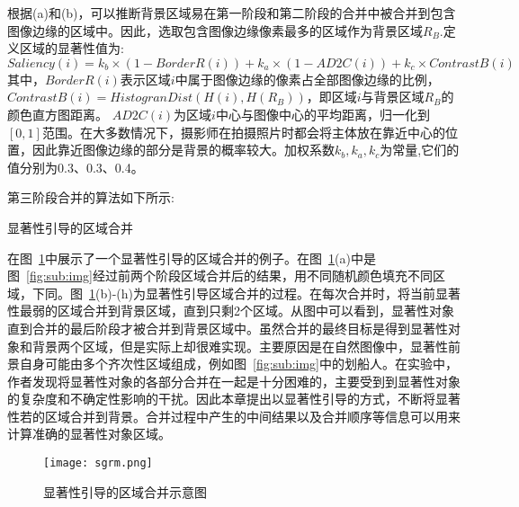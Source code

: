 根据(a)和(b)，可以推断背景区域易在第一阶段和第二阶段的合并中被合并到包含图像边缘的区域中。因此，选取包含图像边缘像素最多的区域作为背景区域$R_B$.定义区域的显著性值为:
\begin{equation}
   \label{equ:chap2:Saliency}
   Saliency(i)=k_b \times (1-BorderR(i))+ k_a \times (1-AD2C(i)) + k_c \times ContrastB(i)
\end{equation}
其中，$BorderR(i)$表示区域$i$中属于图像边缘的像素占全部图像边缘的比例，$ContrastB(i)=HistogranDist(H(i),H(R_B ))$，即区域$i$与背景区域$R_B$的颜色直方图距离。 $AD2C(i)$为区域$i$中心与图像中心的平均距离，归一化到$[0,1]$范围。在大多数情况下，摄影师在拍摄照片时都会将主体放在靠近中心的位置，因此靠近图像边缘的部分是背景的概率较大。加权系数$k_b,k_a,k_c$为常量,它们的值分别为0.3、0.3、0.4。\par
第三阶段合并的算法如下所示:
\renewcommand{\algorithmcfname}{算法}
\begin{algorithm}[htb]
\LinesNumbered
{}



\label{alg:algMergeP3}
\caption{显著性引导的区域合并}
\end{algorithm}
\par
在图~\ref{fig:sgrm}中展示了一个显著性引导的区域合并的例子。在图~\ref{fig:sgrm}(a)中是图~\ref{fig:sub:img}经过前两个阶段区域合并后的结果，用不同随机颜色填充不同区域，下同。图~\ref{fig:sgrm}(b)-(h)为显著性引导区域合并的过程。在每次合并时，将当前显著性最弱的区域合并到背景区域，直到只剩2个区域。从图中可以看到，显著性对象直到合并的最后阶段才被合并到背景区域中。虽然合并的最终目标是得到显著性对象和背景两个区域，但是实际上却很难实现。主要原因是在自然图像中，显著性前景自身可能由多个齐次性区域组成，例如图~\ref{fig:sub:img}中的划船人。在实验中，作者发现将显著性对象的各部分合并在一起是十分困难的，主要受到到显著性对象的复杂度和不确定性影响的干扰。因此本章提出以显著性引导的方式，不断将显著性若的区域合并到背景。合并过程中产生的中间结果以及合并顺序等信息可以用来计算准确的显著性对象区域。

\begin{figure}[htb]
  \centering%
      {\texttt{[image: sgrm.png]}}\\

  \caption{显著性引导的区域合并示意图}
  \label{fig:sgrm}
\end{figure}

